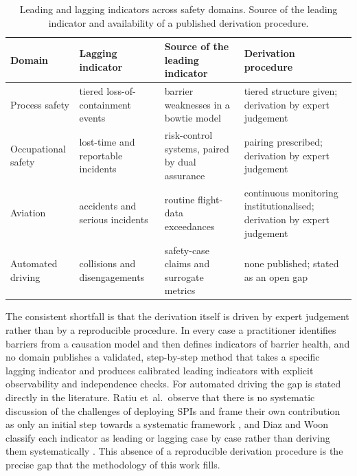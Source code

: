 \begin{table}[htbp]
    \centering
    \caption[Leading and lagging indicators across safety domains]{Leading and lagging indicators across safety domains. Source of the leading indicator and availability of a published derivation procedure.}
    \label{tab:crossdomain}
    \small
    \begin{tabular}{@{}>{\raggedright\arraybackslash}p{2.7cm} >{\raggedright\arraybackslash}p{3.1cm} >{\raggedright\arraybackslash}p{4.0cm} >{\raggedright\arraybackslash}p{3.4cm}@{}}
        \toprule
        \textbf{Domain} & \textbf{Lagging indicator} & \textbf{Source of the leading indicator} & \textbf{Derivation procedure} \\
        \midrule
        Process safety \cite{ccps2018metrics,apirp754} & tiered loss-of-containment
        events & barrier weaknesses in a bowtie model & tiered structure given;
        derivation by expert judgement \\[2pt]
        Occupational safety \cite{hse2006hsg254} & lost-time and reportable
        incidents & risk-control systems, paired by dual assurance & pairing
        prescribed; derivation by expert judgement \\[2pt]
        Aviation \cite{icao9859} & accidents and serious incidents & routine
        flight-data exceedances & continuous monitoring institutionalised;
        derivation by expert judgement \\[2pt]
        Automated driving \cite{ul4600,ratiu2024} & collisions and
        disengagements & safety-case claims and surrogate metrics & none published;
        stated as an open gap \\
        \bottomrule
    \end{tabular}
\end{table}

The consistent shortfall is that the derivation itself is driven by expert judgement
rather than by a reproducible procedure. In every case a practitioner identifies
barriers from a causation model and then defines indicators of barrier health, and no
domain publishes a validated, step-by-step method that takes a specific lagging
indicator and produces calibrated leading indicators with explicit observability and
independence checks. For automated driving the gap is stated directly in the
literature. Ratiu et~al.\ observe that there is no systematic discussion of the
challenges of deploying \acp{SPI} and frame their own contribution as only an initial
step towards a systematic framework \cite{ratiu2024}, and Diaz and Woon classify each
indicator as leading or lagging case by case rather than deriving them systematically
\cite{diaz2022drspi}. This absence of a reproducible derivation procedure is the
precise gap that the methodology of this work fills.

